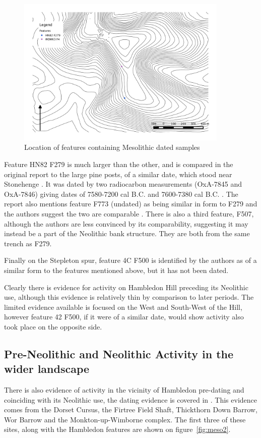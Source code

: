 \begin{figure}
\begin{center}
	\includegraphics[width=0.9\textwidth]{figures/meso-features}
\end{center}
  \caption{Location of features containing Mesolithic dated samples}
  \label{fig:meso1}
\end{figure}

Feature HN82 F279 is much larger than the other, and is compared in the original report to the large pine posts, of a similar date, which stood near Stonehenge \citep[48]{Mercer:2008fk}. It was dated by two radiocarbon measurements (OxA-7845 and OxA-7846) giving dates of 7580-7200 cal B.C. and 7600-7380 cal B.C. \citep[46]{Mercer:2008fk}. The report also mentions feature F773 (undated) as being similar in form to F279 and the authors suggest the two are comparable \citep[46]{Mercer:2008fk}. There is also a third feature, F507, although the authors are less convinced by its comparability, suggesting it may instead be a part of the Neolithic bank structure. They are both from the same trench as F279.

Finally on the Stepleton spur, feature 4C F500 is identified by the authors as of a similar form to the features mentioned above, \citep[48]{Mercer:2008fk} but it has not been dated. 

Clearly there is evidence for activity on Hambledon Hill preceding its Neolithic use, although this evidence is relatively thin by comparison to later periods. The limited evidence available is focused on the West and South-West of the Hill, however feature 42 F500, if it were of a similar date, would show activity also took place on the opposite side.

\subsection{Pre-Neolithic and Neolithic Activity in the wider landscape}
There is also evidence of activity in the vicinity of Hambledon pre-dating and coinciding with its Neolithic use, the dating evidence is covered in \citep[151]{Whittle:2011kl}. This evidence comes from the Dorset Cursus, the Firtree Field Shaft, Thickthorn Down Barrow, Wor Barrow and the Monkton-up-Wimborne complex. The first three of these sites, along with the Hambledon features are shown on figure~\ref{fig:meso2}.

